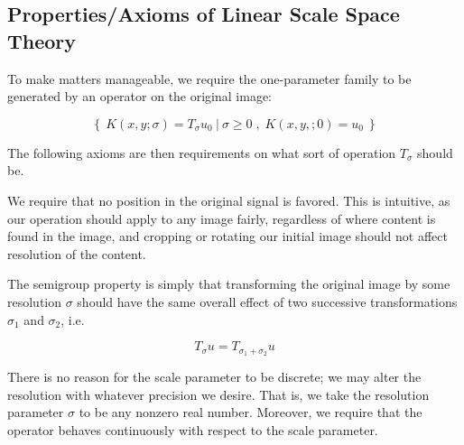     \subsection{Properties/Axioms of Linear Scale Space Theory}
	 To make matters manageable, we require the one-parameter family to be generated by an operator on the original image:
	 
	\begin{equation}
		\left\{\ K(x,y;\sigma) = T_\sigma u_0
		\ \lvert \ 
		\sigma \ge 0
		\; ,\; K(x,y,;0) = u_0
		\ \right\} 
	\end{equation}
    
	The following axioms are then requirements on what sort of operation $T_\sigma$ should be.
		
    \begin{axiom}
    	\label{axiom:linear-shift-and-rotation}
    We require that no position in the original signal is favored.  This is intuitive, as our operation should apply to any image fairly, regardless of where content is found in the image, and cropping or rotating our initial image should not affect resolution of the content.
\end{axiom}
   
     \begin{axiom} \label{axiom:semigroup}
   	The semigroup property is simply that transforming
   	the original image by some resolution $\sigma$ should
   	have the same overall effect of two successive
   	transformations $\sigma_1$ and $\sigma_2$, i.e.
   	
   	\begin{equation}	
   	T_{\sigma} u = T_{\sigma_1 + \sigma_2} u
   	\end{equation}
   \end{axiom}
 
    \begin{axiom}
    	\label{axiom:continuity} There is no reason for the scale parameter to be discrete; we may alter the resolution with whatever precision we desire. That is, we take the resolution
    parameter $\sigma$ to be any nonzero real number. Moreover, we require that the operator behaves continuously with respect to the scale parameter.
        \end{axiom}
    
	
